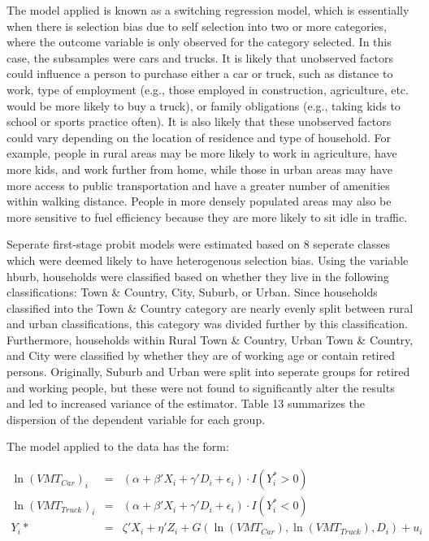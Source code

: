 \documentclass{article}
\begin{document}
The model applied is known as a switching regression model, which is essentially when there is selection bias due to self selection into two or more categories, where the outcome variable is only observed for the category selected.  In this case, the subsamples were cars and trucks.  It is likely that unobserved factors could influence a person to purchase either a car or truck, such as distance to work, type of employment (e.g., those employed in construction, agriculture, etc. would be more likely to buy a truck), or family obligations (e.g., taking kids to school or sports practice often).  It is also likely that these unobserved factors could vary depending on the location of residence and type of household.  For example, people in rural areas may be more likely to work in agriculture, have more kids, and work further from home, while those in urban areas may have more access to public transportation and have a greater number of amenities within walking distance.  People in more densely populated areas may also be more sensitive to fuel efficiency because they are more likely to sit idle in traffic.


Seperate first-stage probit models were estimated based on 8 seperate classes which were deemed likely to have heterogenous selection bias.  Using the variable hburb, households were classified based on whether they live in the following classifications: Town \& Country, City, Suburb, or Urban.  Since households classified into the Town \& Country category are nearly evenly split between rural and urban classifications, this category was divided further by this classification.  Furthermore, households within Rural Town \& Country, Urban Town \& Country, and City were classified by whether they are of working age or contain retired persons.  Originally, Suburb and Urban were split into seperate groups for retired and working people, but these were not found to significantly alter the results and led to increased variance of the estimator.  Table 13 summarizes the dispersion of the dependent variable for each group.

The model applied to the data has the form:

\begin{eqnarray*}
\ln(VMT_{Car})_i&=&(\alpha + \beta'X_i +\gamma'D_i + \epsilon_i)\cdot I(Y^*_i>0) \\
\ln(VMT_{Truck})_i&=&(\alpha + \beta'X_i +\gamma'D_i + \epsilon_i)\cdot I(Y^*_i<0) \\
Y_i*&=&\zeta'X_i + \eta'Z_i + G(\ln(VMT_{Car}), \ln(VMT_{Truck}), D_i) + u_i
\end{eqnarray*}
\end{document}
